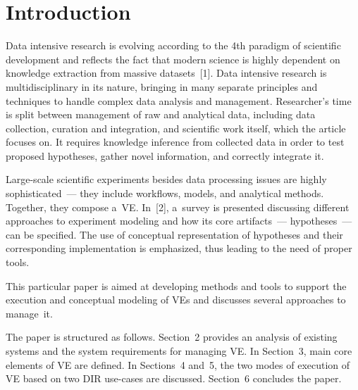 





 \thispagestyle{myheadings}

 \begin{multicols}{2}

 \label{st\stat}

\section{Introduction}

\vspace*{-2pt}

      \noindent
      Data intensive research is evolving according to the 4th paradigm of 
scientific development and reflects the fact that modern science is highly dependent 
on knowledge extraction from massive datasets~[1]. Data intensive research is 
multidisciplinary in its nature, bringing in many separate principles and techniques to 
handle complex data analysis and management. Researcher's time is split between 
management of raw and analytical data, including data collection, curation and 
integration, and scientific work itself, which the article focuses on. It requires 
knowledge inference from collected data in order to test proposed hypotheses, gather 
novel information, and correctly integrate it. 
      
      Large-scale scientific experiments besides data processing issues are highly 
sophisticated~--- they include workflows, models, and analytical methods. Together, 
they compose a~VE. In~[2], a~survey is presented discussing 
different approaches to experiment modeling and how its core artifacts~--- 
hypotheses~--- can be specified. The use of conceptual representation of hypotheses and 
their corresponding implementation is emphasized, thus leading to the need of proper 
tools.
      
      This particular paper is aimed at developing methods and tools to support the 
execution and conceptual modeling of VEs and discusses several 
approaches to manage~it. 
      
      The paper is structured as follows. Section~2 provides an analysis of existing 
systems and the system requirements for managing VE. In Section~3, main core 
elements of VE are defined. In Sections~4 and~5, the two modes of execution of VE 
based on two DIR use-cases are discussed. Section~6 concludes the paper.
      

\end{multicols}

